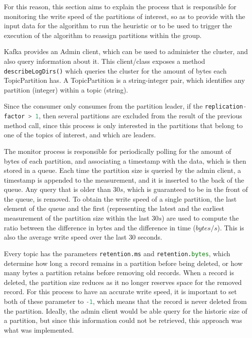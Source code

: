 For this reason, this section aims to explain the process that is responsible for monitoring the write speed of the partitions of interest, so as to provide with the input data for the algorithm to run the heuristic or to be used to trigger the execution of the algorithm to reassign partitions within the group.

Kafka provides an Admin client, which can be used to administer the cluster, and also query information about it. This client/class exposes a method \lstinline[language=Python]{describeLogDirs()} which queries the cluster for the amount of bytes each TopicPartition has. A TopicPartition is a string-integer pair, which identifies any partition (integer) within a topic (string). 

Since the consumer only consumes from the partition leader, if the \lstinline[language=Python]{replication-factor > 1}, then several partitions are excluded from the result of the previous method call, since this process is only interested in the partitions that belong to one of the topics of interest, and which are leaders.

The monitor process is responsible for periodically polling for the amount of bytes of each partition, and associating a timestamp with the data, which is then stored in a queue. Each time the partition size is queried by the admin client, a timestamp is appended to the measurement, and it is inserted to the back of the queue. Any query that is older than $30s$, which is guaranteed to be in the front of the queue, is removed. To obtain the write speed of a single partition, the last element of the queue and the first (representing the latest and the earliest measurement of the partition size within the last $30s$) are used to compute the ratio between the difference in bytes and the difference in time ($bytes/s$). This is also the average write speed over the last 30 seconds.

Every topic has the parameters \lstinline[language=Python]{retention.ms} and \lstinline[language=Python]{retention.bytes}, which determine how long a record remains in a partition before being deleted, or how many bytes a partition retains before removing old records. When a record is deleted, the partition size reduces as it no longer reserves space for the removed record. For this process to have an accurate write speed, it is important to set both of these parameter to \lstinline[language=Python]{-1}, which means that the record is never deleted from the partition. Ideally, the admin client would be able query for the historic size of a partition, but since this information could not be retrieved, this approach was what was implemented.

